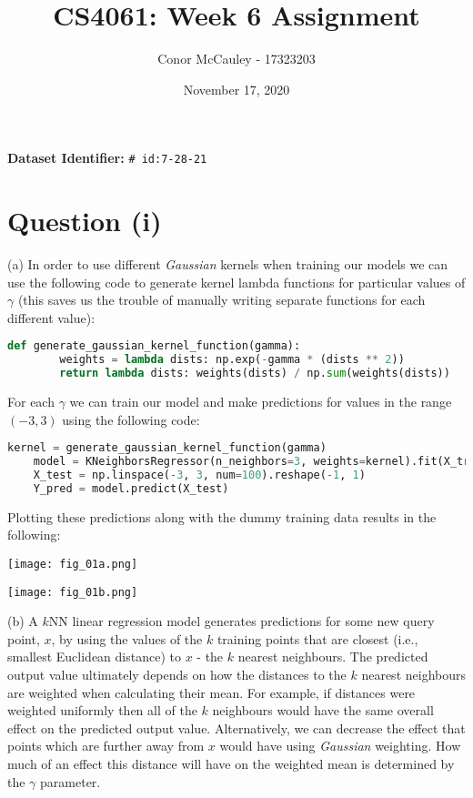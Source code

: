 \documentclass[12pt]{article}
\title{CS4061: Week 6 Assignment}
\author{Conor McCauley - 17323203}
\date{November 17, 2020}
\begin{document}
\maketitle

\noindent \textbf{Dataset Identifier:} \texttt{\# id:7-28-21}

\section*{Question (i)}

\noindent (a) In order to use different \textit{Gaussian} kernels when training our models we can use the following code to generate kernel lambda functions for particular values of $\gamma$ (this saves us the trouble of manually writing separate functions for each different value):

\begin{center}
    \lstset{basicstyle=\footnotesize}
    \begin{lstlisting}[language=Python]
    def generate_gaussian_kernel_function(gamma):
        weights = lambda dists: np.exp(-gamma * (dists ** 2))
        return lambda dists: weights(dists) / np.sum(weights(dists))
    \end{lstlisting}
\end{center}

For each $\gamma$ we can train our model and make predictions for values in the range $(-3, 3)$ using the following code:

\begin{center}
    \lstset{basicstyle=\footnotesize}
    \begin{lstlisting}[language=Python]
    kernel = generate_gaussian_kernel_function(gamma)
    model = KNeighborsRegressor(n_neighbors=3, weights=kernel).fit(X_train, Y_train)
    X_test = np.linspace(-3, 3, num=100).reshape(-1, 1)
    Y_pred = model.predict(X_test)
    \end{lstlisting}
\end{center}

Plotting these predictions along with the dummy training data results in the following:

\begin{center}
    \texttt{[image: fig\_01a.png]}
    
    \texttt{[image: fig\_01b.png]}
\end{center}

\noindent (b) A $k$NN linear regression model generates predictions for some new query point, $x$, by using the values of the $k$ training points that are closest (i.e., smallest Euclidean distance) to $x$ - the $k$ nearest neighbours. The predicted output value ultimately depends on how the distances to the $k$ nearest neighbours are weighted when calculating their mean. For example, if distances were weighted uniformly then all of the $k$ neighbours would have the same overall effect on the predicted output value. Alternatively, we can decrease the effect that points which are further away from $x$ would have using \textit{Gaussian} weighting. How much of an effect this distance will have on the weighted mean is determined by the $\gamma$ parameter.
\end{document}
